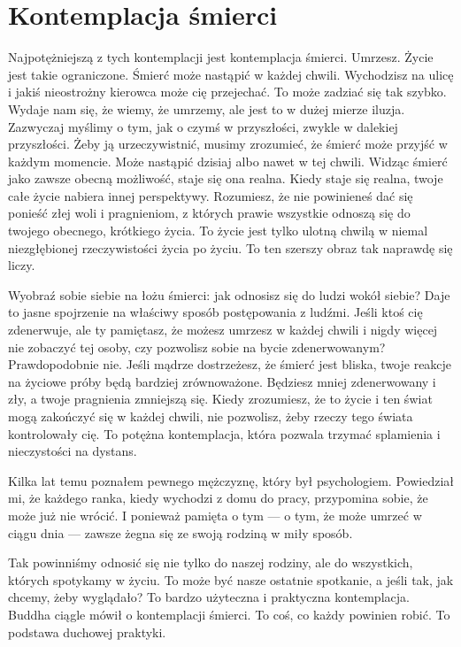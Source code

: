 \documentclass[12pt,openany]{book}
\begin{document}
\section*{Kontemplacja śmierci}

Najpotężniejszą z tych kontemplacji jest kontemplacja śmierci. \linebreak Umrzesz. Życie jest takie ograniczone. Śmierć może nastąpić w każdej chwili. Wychodzisz na ulicę i jakiś nieostrożny kierowca może cię przejechać. To może zadziać się tak szybko.
Wydaje nam się, że wiemy, że umrzemy, ale jest to w dużej mierze iluzja. Zazwyczaj myślimy o tym, jak o czymś w przyszłości, zwykle w dalekiej przyszłości. Żeby ją urzeczywistnić, musimy zrozumieć, że śmierć może przyjść w każdym momencie. Może nastąpić dzisiaj albo nawet w tej chwili. Widząc śmierć jako zawsze obecną możliwość, staje się ona realna. Kiedy staje się realna, twoje całe życie nabiera innej perspektywy. Rozumiesz, że nie powinieneś dać się ponieść złej woli i pragnieniom, z których prawie wszystkie odnoszą się do twojego obecnego, krótkiego życia. To życie jest tylko ulotną chwilą w niemal niezgłębionej rzeczywistości życia po życiu. To ten szerszy obraz tak naprawdę się liczy.

Wyobraź sobie siebie na łożu śmierci: jak odnosisz się do ludzi wokół siebie? Daje to jasne spojrzenie na właściwy sposób postępowania z ludźmi. Jeśli ktoś cię zdenerwuje, ale ty pamiętasz, że możesz umrzesz w każdej chwili i nigdy więcej nie zobaczyć tej osoby, czy pozwolisz sobie na bycie zdenerwowanym? Prawdopodobnie nie. Jeśli mądrze dostrzeżesz, że śmierć jest bliska, twoje reakcje na życiowe próby będą bardziej zrównoważone. Będziesz mniej zdenerwowany i zły, a twoje pragnienia zmniejszą się. Kiedy zrozumiesz, że to życie i ten świat mogą zakończyć się w każdej chwili, nie pozwolisz, żeby rzeczy tego świata kontrolowały cię. To potężna kontemplacja, która pozwala trzymać splamienia i nieczystości na dystans.

Kilka lat temu poznałem pewnego mężczyznę, który był psychologiem. Powiedział mi, że każdego ranka, kiedy wychodzi z domu do pracy, przypomina sobie, że może już nie wrócić. I ponieważ pamięta o tym --- o tym, że może umrzeć w ciągu dnia --- zawsze żegna się ze swoją rodziną w miły sposób.

Tak powinniśmy odnosić się nie tylko do naszej rodziny, ale do wszystkich, których spotykamy w życiu. To może być nasze ostatnie spotkanie, a jeśli tak, jak chcemy, żeby wyglądało? To bardzo użyteczna i praktyczna kontemplacja. Buddha ciągle mówił o kontemplacji śmierci. To coś, co każdy powinien robić. To podstawa duchowej praktyki.
\end{document}
